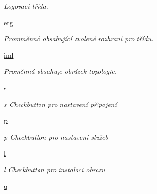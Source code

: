 \begin{DoxyCompactItemize}
\begin{DoxyCompactList}\small\item\em Logovací třída. \end{DoxyCompactList}\item 
\hypertarget{classcloseSetup_1_1App_a24826e8679eaa9d1866df9e1172dc716}{\hyperlink{classcloseSetup_1_1App_a24826e8679eaa9d1866df9e1172dc716}{etg}}\label{df/df9/classcloseSetup_1_1App_a24826e8679eaa9d1866df9e1172dc716}

\begin{DoxyCompactList}\small\item\em Promměnná obsahující zvolené rozhraní pro třídu. \end{DoxyCompactList}\item 
\hypertarget{classcloseSetup_1_1App_a1f906c533c8fd3e9352eed11b43b86d9}{\hyperlink{classcloseSetup_1_1App_a1f906c533c8fd3e9352eed11b43b86d9}{iml}}\label{df/df9/classcloseSetup_1_1App_a1f906c533c8fd3e9352eed11b43b86d9}

\begin{DoxyCompactList}\small\item\em Proměnná obsahuje obrázek topologie. \end{DoxyCompactList}\item 
\hypertarget{classcloseSetup_1_1App_a9762b9f2129fd5df0bd4e67c71dd9e9a}{\hyperlink{classcloseSetup_1_1App_a9762b9f2129fd5df0bd4e67c71dd9e9a}{s}}\label{df/df9/classcloseSetup_1_1App_a9762b9f2129fd5df0bd4e67c71dd9e9a}

\begin{DoxyCompactList}\small\item\em s Checkbutton pro nastavení připojení \end{DoxyCompactList}\item 
\hypertarget{classcloseSetup_1_1App_a637c65466089e313883e58ba012c4d4b}{\hyperlink{classcloseSetup_1_1App_a637c65466089e313883e58ba012c4d4b}{p}}\label{df/df9/classcloseSetup_1_1App_a637c65466089e313883e58ba012c4d4b}

\begin{DoxyCompactList}\small\item\em p Checkbutton pro nastavení služeb \end{DoxyCompactList}\item 
\hypertarget{classcloseSetup_1_1App_a7ae7fb08de3a6ce4aa2feeb992ac6d7c}{\hyperlink{classcloseSetup_1_1App_a7ae7fb08de3a6ce4aa2feeb992ac6d7c}{l}}\label{df/df9/classcloseSetup_1_1App_a7ae7fb08de3a6ce4aa2feeb992ac6d7c}

\begin{DoxyCompactList}\small\item\em l Checkbutton pro instalaci obrazu \end{DoxyCompactList}\item 
\hypertarget{classcloseSetup_1_1App_a71dcf82d61ce8d8315cb11946529678d}{\hyperlink{classcloseSetup_1_1App_a71dcf82d61ce8d8315cb11946529678d}{q}}\label{df/df9/classcloseSetup_1_1App_a71dcf82d61ce8d8315cb11946529678d}


\end{DoxyCompactItemize}
